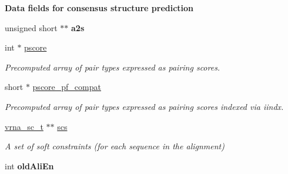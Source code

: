 \begin{Indent}{\bf Data fields for consensus structure prediction}
\begin{DoxyCompactItemize}
\item 
\hypertarget{group__fold__compound_a5804d22ecba317fa64246d41c961bf35}{}unsigned short $\ast$$\ast$ {\bfseries a2s}\label{group__fold__compound_a5804d22ecba317fa64246d41c961bf35}

\item 
int $\ast$ \hyperlink{group__fold__compound_a14dc7755af6019ddbd0cf94b209e89dd}{pscore}
\begin{DoxyCompactList}\small\item\em Precomputed array of pair types expressed as pairing scores. \end{DoxyCompactList}\item 
short $\ast$ \hyperlink{group__fold__compound_abf5e82d14649b6179ae60ed7da6e4fc0}{pscore\+\_\+pf\+\_\+compat}
\begin{DoxyCompactList}\small\item\em Precomputed array of pair types expressed as pairing scores indexed via iindx. \end{DoxyCompactList}\item 
\hyperlink{group__soft__constraints_ga75401ce219ef8dbcceb672db82d434c6}{vrna\+\_\+sc\+\_\+t} $\ast$$\ast$ \hyperlink{group__fold__compound_ac2b047fddabc51a76a96511174e47db1}{scs}
\begin{DoxyCompactList}\small\item\em A set of soft constraints (for each sequence in the alignment) \end{DoxyCompactList}\item 
\hypertarget{group__fold__compound_ac539df9233472dd76d070f4a821185a9}{}int {\bfseries old\+Ali\+En}\label{group__fold__compound_ac539df9233472dd76d070f4a821185a9}

\end{DoxyCompactItemize}
\end{Indent}
